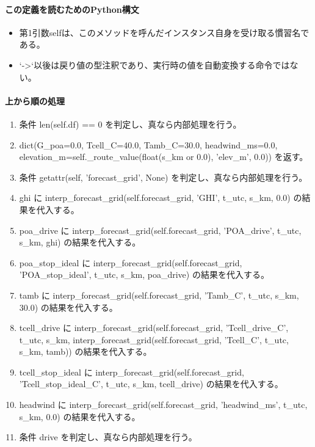 \documentclass[a4paper,11pt]{article}
\begin{document}
            \paragraph{この定義を読むためのPython構文}
            \begin{itemize}[leftmargin=1.6em]
            \item 第1引数selfは、このメソッドを呼んだインスタンス自身を受け取る慣習名である。
\item `->`以後は戻り値の型注釈であり、実行時の値を自動変換する命令ではない。
            \end{itemize}
            \paragraph{上から順の処理}
            \begin{enumerate}[leftmargin=1.8em]
            \item 条件 len(self.df) == 0 を判定し、真なら内部処理を行う。
\item   dict(G\_poa=0.0, Tcell\_C=40.0, Tamb\_C=30.0, headwind\_ms=0.0, elevation\_m=self.\_route\_value(float(s\_km or 0.0), 'elev\_m', 0.0)) を返す。
\item 条件 getattr(self, 'forecast\_grid', None) を判定し、真なら内部処理を行う。
\item   ghi に interp\_forecast\_grid(self.forecast\_grid, 'GHI', t\_utc, s\_km, 0.0) の結果を代入する。
\item   poa\_drive に interp\_forecast\_grid(self.forecast\_grid, 'POA\_drive', t\_utc, s\_km, ghi) の結果を代入する。
\item   poa\_stop\_ideal に interp\_forecast\_grid(self.forecast\_grid, 'POA\_stop\_ideal', t\_utc, s\_km, poa\_drive) の結果を代入する。
\item   tamb に interp\_forecast\_grid(self.forecast\_grid, 'Tamb\_C', t\_utc, s\_km, 30.0) の結果を代入する。
\item   tcell\_drive に interp\_forecast\_grid(self.forecast\_grid, 'Tcell\_drive\_C', t\_utc, s\_km, interp\_forecast\_grid(self.forecast\_grid, 'Tcell\_C', t\_utc, s\_km, tamb)) の結果を代入する。
\item   tcell\_stop\_ideal に interp\_forecast\_grid(self.forecast\_grid, 'Tcell\_stop\_ideal\_C', t\_utc, s\_km, tcell\_drive) の結果を代入する。
\item   headwind に interp\_forecast\_grid(self.forecast\_grid, 'headwind\_ms', t\_utc, s\_km, 0.0) の結果を代入する。
\item   条件 drive を判定し、真なら内部処理を行う。

\end{enumerate}
\end{document}
